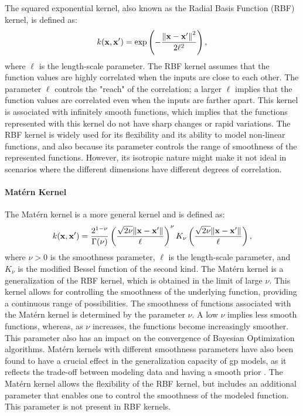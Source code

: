 The squared exponential kernel, also known as the Radial Basis Function (RBF) kernel, is defined as:
\[ k(\mathbf{x}, \mathbf{x}^\prime) = \exp\left(-\frac{\norm{\mathbf{x} - \mathbf{x}^\prime}^2}{2\ell^2}\right),\]
where $\ell$ is the length-scale parameter. The RBF kernel assumes that the function values are highly correlated when the inputs are close to each other. The parameter $\ell$ controls the "reach" of the correlation; a larger $\ell$ implies that the function values are correlated even when the inputs are farther apart. This kernel is associated with infinitely smooth functions, which implies that the functions represented with this kernel do not have sharp changes or rapid variations. The RBF kernel is widely used for its flexibility and its ability to model non-linear functions, and also because its parameter controls the range of smoothness of the represented functions. However, its isotropic nature might make it not ideal in scenarios where the different dimensions have different degrees of correlation.

\paragraph{Mat\'ern Kernel}

The Mat\'ern kernel is a more general kernel and is defined as:
\[ k(\mathbf{x}, \mathbf{x}^\prime) = \frac{2^{1-\nu}}{\Gamma(\nu)}\left(\frac{\sqrt{2\nu}\norm{\mathbf{x}-\mathbf{x}^\prime}}{\ell}\right)^\nu K_\nu\left(\frac{\sqrt{2\nu}\norm{\mathbf{x}-\mathbf{x}^\prime}}{\ell}\right),\]
where $\nu > 0$ is the smoothness parameter, $\ell$ is the length-scale parameter, and $K_\nu$ is the modified Bessel function of the second kind. The Mat\'ern kernel is a generalization of the RBF kernel, which is obtained in the limit of large $\nu$.  This kernel allows for controlling the smoothness of the underlying function, providing a continuous range of possibilities. The smoothness of functions associated with the Mat\'ern kernel is determined by the parameter $\nu$. A low $\nu$ implies less smooth functions, whereas, as $\nu$ increases, the functions become increasingly smoother. This parameter also has an impact on the convergence of Bayesian Optimization algorithms. Mat\'ern kernels with different smoothness parameters have also been found to have a crucial effect in the generalization capacity of \ac{gp} models, as it reflects the trade-off between modeling data and having a smooth prior \citep{rasmussen2006gaussian}. The Mat\'ern kernel allows the flexibility of the RBF kernel, but includes an additional parameter that enables one to control the smoothness of the modeled function. This parameter is not present in RBF kernels.

